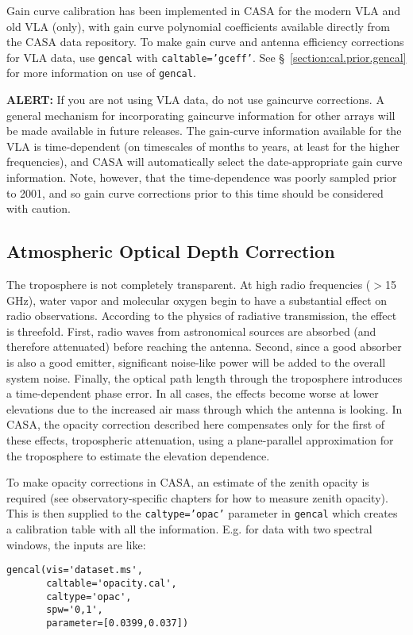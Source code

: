 Gain curve calibration has been implemented in CASA for the modern VLA
and old VLA (only), with gain curve polynomial coefficients available
directly from the CASA data repository.  To make gain curve and
antenna efficiency corrections for VLA data, use {\tt gencal} with
{\tt caltable='gceff'}. See \S~\ref{section:cal.prior.gencal} for more information on use
of {\tt gencal}.



{\bf ALERT:} 
If you are not using VLA data, do not use gaincurve corrections.
A general mechanism for incorporating gaincurve information for
other arrays will be made available in future releases.
The gain-curve information available for the VLA is
time-dependent (on timescales of months to years, at least for the 
higher frequencies), and CASA will automatically select 
the date-appropriate gain curve information.  Note, however, that 
the time-dependence was poorly sampled prior to 2001, and so gain 
curve corrections prior to this time should be considered with caution.  


\subsection{Atmospheric Optical Depth Correction}
\label{section:cal.prior.opacity}

The troposphere is not completely transparent.  At high radio
frequencies ($>$15 GHz), water vapor and molecular oxygen begin to
have a substantial effect on radio observations. According to the
physics of radiative transmission, the effect is threefold.  First,
radio waves from astronomical sources are absorbed (and therefore
attenuated) before reaching the antenna.  Second, since a good absorber
is also a good emitter, significant noise-like power will be added to
the overall system noise.  Finally, the optical path length through
the troposphere introduces a time-dependent phase error.  In all
cases, the effects become worse at lower elevations due to the
increased air mass through which the antenna is looking.  In CASA,
the opacity correction described here compensates only for the first
of these effects, tropospheric attenuation, using a plane-parallel
approximation for the troposphere to estimate the elevation
dependence.

To make
opacity corrections in CASA, an estimate of the zenith opacity is
required (see observatory-specific chapters for how to measure zenith
opacity).  This is then supplied to the {\tt caltype='opac'} parameter
in {\tt gencal} which creates a calibration table with all the
information. E.g. for data with two spectral windows, the inputs are
like: 
\small
\begin{verbatim}
gencal(vis='dataset.ms',
       caltable='opacity.cal',
       caltype='opac',
       spw='0,1',
       parameter=[0.0399,0.037])
\end{verbatim}
\normalsize


